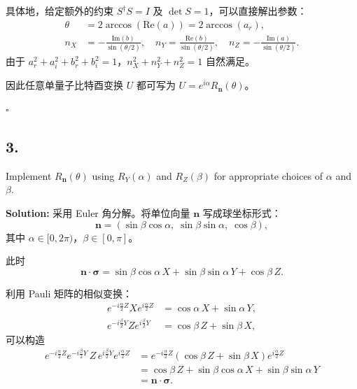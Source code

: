 \documentclass{ctexart}
\begin{document}
具体地，给定额外的约束 $S^\dagger S = I$ 及 $\det S = 1$，可以直接解出参数：
\begin{align*}
    \theta &= 2\arccos(\mathrm{Re}(a)) = 2\arccos(a_r), \\
    n_X    &= -\frac{\mathrm{Im}(b)}{\sin(\theta/2)}, \quad
    n_Y    = \frac{\mathrm{Re}(b)}{\sin(\theta/2)}, \quad
    n_Z    = -\frac{\mathrm{Im}(a)}{\sin(\theta/2)}.
\end{align*}
由于 $a_r^2 + a_i^2 + b_r^2 + b_i^2 = 1$，$n_X^2+n_Y^2+n_Z^2 = 1$ 自然满足。

因此任意单量子比特酉变换 $U$ 都可写为 $U = e^{i\alpha}R_{\mathbf{n}}(\theta)$。

\hfill $\square$

\subsection*{3.}
Implement $R_{\mathbf{n}}(\theta)$ using $R_Y(\alpha)$ and $R_Z(\beta)$ for appropriate choices of $\alpha$ and $\beta$.

\medskip
\noindent\textbf{Solution:}
采用 Euler 角分解。将单位向量 $\mathbf{n}$ 写成球坐标形式：
\begin{equation*}
    \mathbf{n} = (\sin\beta\cos\alpha,\; \sin\beta\sin\alpha,\; \cos\beta),
\end{equation*}
其中 $\alpha \in [0, 2\pi)$，$\beta \in [0, \pi]$。

此时
\begin{equation*}
    \mathbf{n}\cdot\boldsymbol{\sigma}
    = \sin\beta\cos\alpha\, X + \sin\beta\sin\alpha\, Y + \cos\beta\, Z.
\end{equation*}

利用 Pauli 矩阵的相似变换：
\begin{align*}
    e^{-i\frac{\alpha}{2}Z} X e^{i\frac{\alpha}{2}Z} &= \cos\alpha\, X + \sin\alpha\, Y, \\
    e^{-i\frac{\beta}{2}Y} Z e^{i\frac{\beta}{2}Y}  &= \cos\beta\, Z + \sin\beta\, X,
\end{align*}
可以构造
\begin{align*}
    e^{-i\frac{\alpha}{2}Z} e^{-i\frac{\beta}{2}Y}\, Z\,
    e^{i\frac{\beta}{2}Y} e^{i\frac{\alpha}{2}Z}
    &= e^{-i\frac{\alpha}{2}Z} (\cos\beta\, Z + \sin\beta\, X) e^{i\frac{\alpha}{2}Z} \\
    &= \cos\beta\, Z + \sin\beta\cos\alpha\, X + \sin\beta\sin\alpha\, Y \\
    &= \mathbf{n}\cdot\boldsymbol{\sigma}.
\end{align*}
\end{document}
